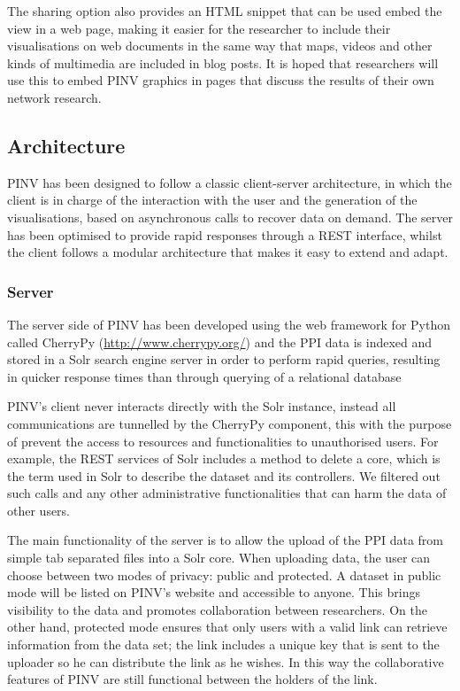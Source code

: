 The sharing option also provides an HTML snippet that can be used embed the view in a web page, making it easier for the researcher to include their visualisations on web documents in the same way that maps, videos and other kinds of multimedia are included in blog posts. It is hoped that researchers will use this to embed PINV graphics in pages that discuss the results of their own network research.




\subsection{Architecture} \label{pinv_architecture}
PINV has been designed to follow a classic client-server architecture, in which the client is in charge of the interaction with the user and the generation of the visualisations, based on asynchronous calls to recover data on demand. The server has been optimised to provide rapid responses through a REST interface, whilst the client follows a modular architecture that makes it easy to extend and adapt. 


\subsubsection{Server}
The server side of PINV has been developed using the web framework for Python called CherryPy (\url{http://www.cherrypy.org/}) and the PPI data is indexed and stored in a Solr search engine server \cite{KUC2013} in order to perform rapid queries, resulting in quicker response times than through querying of a relational database

PINV's client never interacts directly with the Solr instance, instead all communications are tunnelled by the CherryPy component, this with the purpose of prevent the access to resources and functionalities to unauthorised users. For example, the REST services of Solr includes a method to delete a core, which is the term used in Solr to describe the dataset and its controllers. We filtered out such calls and any other administrative functionalities that can harm the data of other users.

The main functionality of the server is to allow the upload of the PPI data from simple tab separated files into a Solr core. When uploading data, the user can choose between two modes of privacy: public and protected. A dataset in public mode will be listed on PINV’s website and accessible to anyone. This brings visibility to the data and promotes collaboration between researchers. On the other hand, protected mode ensures that only users with a valid link can retrieve information from the data set; the link includes a unique key that is sent to the uploader so he can distribute the link as he wishes. In this way the collaborative features of PINV are still functional between the holders of the link.

